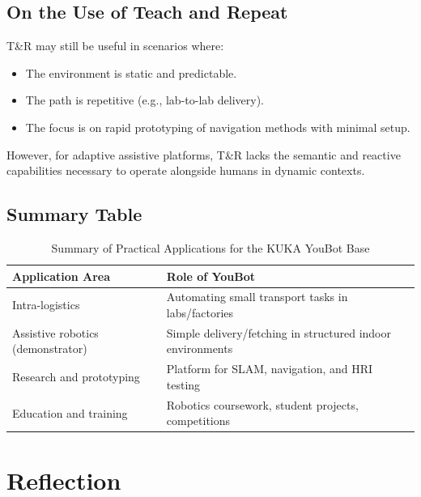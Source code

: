 \documentclass[a4paper, 12pt]{article}
\begin{document}
    \subsection{On the Use of Teach and Repeat}

    T\&R may still be useful in scenarios where:

    \begin{itemize}[noitemsep]
        \item The environment is static and predictable.
        \item The path is repetitive (e.g., lab-to-lab delivery).
        \item The focus is on rapid prototyping of navigation methods with minimal setup.
    \end{itemize}

    However, for adaptive assistive platforms, T\&R lacks the semantic and reactive capabilities necessary to operate alongside humans in dynamic contexts.

    \subsection{Summary Table}

    \begin{table}[H]
    \centering
    \begin{tabular}{|l|p{7cm}|}
    \hline
    \textbf{Application Area} & \textbf{Role of YouBot} \\
    \hline
    Intra-logistics & Automating small transport tasks in labs/factories \\
    Assistive robotics (demonstrator) & Simple delivery/fetching in structured indoor environments \\
    Research and prototyping & Platform for SLAM, navigation, and HRI testing \\
    Education and training & Robotics coursework, student projects, competitions \\
    \hline
    \end{tabular}
    \caption{Summary of Practical Applications for the KUKA YouBot Base}
    \end{table}


    


    \pagebreak

    \section{Reflection}
\end{document}
